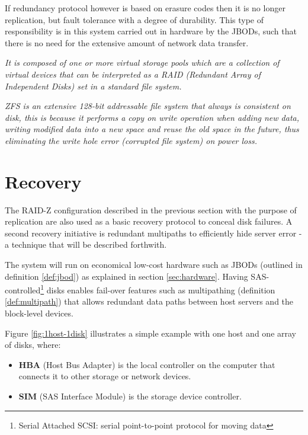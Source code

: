 If redundancy protocol however is based on erasure codes then it is no longer replication, but fault tolerance with a degree of durability. This type of responsibility is in this system carried out in hardware by the JBODs, such that there is no need for the extensive amount of network data transfer.
\vspace*{1mm}

\begin{definition}[ZFS] \label{def:zfs}
\textit{It is composed of one or more virtual storage pools which are a collection of virtual devices that can be interpreted as a RAID (Redundant Array of Independent Disks) set in a standard file system.}
\newline

\textit{ZFS is an extensive 128-bit addressable file system that always is consistent on disk, this is because it performs a copy on write operation when adding new data, \ie writing modified data into a new space and reuse the old space in the future, thus eliminating the write hole error (corrupted file system) \eg on power loss.}
\end{definition}

\section{Recovery} \label{sec:recovery}
The RAID-Z configuration described in the previous section with the purpose of \eg replication are also used as a basic recovery protocol to conceal disk failures. A second recovery initiative is redundant multipaths to efficiently hide server error - a technique that will be described forthwith.
\newline

The system will run on economical low-cost hardware such as JBODs (outlined in definition \ref{def:jbod}) as explained in section \ref{sec:hardware}. Having SAS-controlled\footnote{Serial Attached SCSI: serial point-to-point protocol for moving data} disks enables fail-over features such as multipathing (definition \ref{def:multipath}) that allows redundant data paths between host servers and the block-level devices. 
\newline

Figure \ref{fig:1host-1disk} illustrates a simple example with one host and one array of disks, where:

\begin{itemize}
	\item \textbf{HBA} (Host Bus Adapter) is the local controller on the computer that connects it to other storage or network devices.
	\item \textbf{SIM} (SAS Interface Module) is the storage device controller.
\end{itemize}
\vspace*{3mm}

